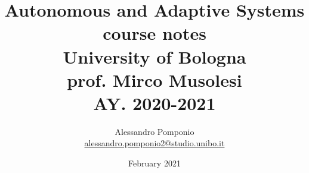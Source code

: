 \usepackage[utf8]{inputenc}
\usepackage{amsmath}
\usepackage{amssymb}
\usepackage{parskip}                    %
\usepackage{verbatim}
\usepackage{graphicx}
\usepackage{hyperref}                   %
\usepackage{wrapfig}                    %
\usepackage{afterpage}                  %
\usepackage{bbm}                        %
\usepackage{bm}                         %
\usepackage{caption}                    %
\usepackage{subfigure}                  %
\usepackage{tocbibind}                  %
\usepackage[
    backend=biber,
    style=alphabetic,
    sorting=ynt
]{biblatex}

\usepackage[ruled,vlined,dotocloa]{algorithm2e}

\newcommand\addemptypage{       %
    \null
    \thispagestyle{empty}
    \addtocounter{page}{-1}
    \newpage
    }

\newcommand{\source}[1]{\vspace{-5pt} \caption*{ Source: {#1}} }

\DeclareMathOperator*{\argmax}{argmax}



\graphicspath{ {./Images/} }

\title{Autonomous and Adaptive Systems \\
        course notes\\
        University of Bologna \\
        \large	 prof. Mirco Musolesi \\
        AY. 2020-2021}
\author{Alessandro Pomponio \\ \href{mailto:alessandro.pomponio2@studio.unibo.it}{alessandro.pomponio2@studio.unibo.it}}
\date{February 2021}



\maketitle
\clearpage
\addemptypage

